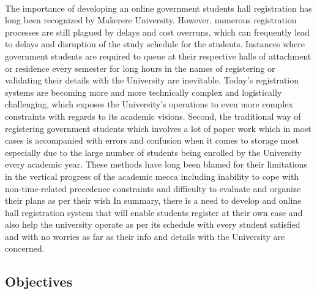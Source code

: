 \documentclass[12pt]{article}
\begin{document}
		\paragraph{}
		The importance of developing an online government students hall registration has long been recognized by Makerere University. However, numerous registration processes are still plagued by delays and cost overruns, which
can frequently lead to delays and disruption of the study schedule for the students. Instances where government students are required to queue at their respective halls of attachment or residence every semester for long hours in the names of registering or validating their details with the University are inevitable. Today’s registration systems are becoming more and more technically complex and logistically challenging, which exposes the University’s operations to even more complex constraints with regards to its academic visions. Second, the traditional way of registering government students which involves a lot of paper work which in most cases is accompanied with errors and confusion when it comes to storage most especially due to the large number of students being enrolled by the University every academic year. These methods have long been blamed for their limitations in the vertical progress of the academic mecca including inability to cope with non-time-related precedence constraints and difficulty to evaluate and organize their plans as per their wish In summary, there is a need to develop and online hall registration system that will enable students register at their own ease and also help the university operate as per its schedule with every student satisfied and with no worries as far as their info and details with the University are concerned.
	\subsection{Objectives}
\end{document}
